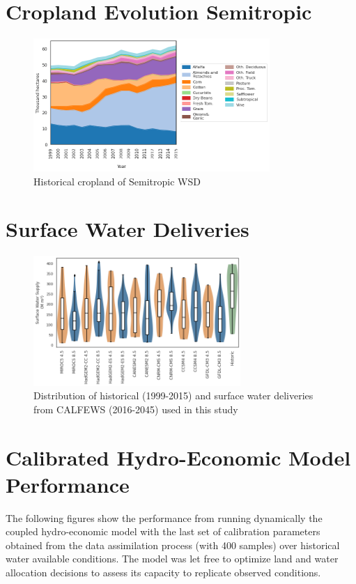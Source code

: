 \documentclass[11pt,a4paper]{article}
\begin{document}
\section{Cropland Evolution Semitropic}

\begin{figure}[H]
    \centering
    \includegraphics[width=0.8\textwidth]{land_hist_semitropic.png}
    \caption{Historical cropland of Semitropic WSD}
    \label{fig:m1esh1}
\end{figure}

\section{Surface Water Deliveries}

\begin{figure}[H]
    \centering
    \includegraphics[width=0.7\textwidth]{gcm_surface_water.png}
    \caption{Distribution of historical (1999-2015) and surface water deliveries from CALFEWS (2016-2045) used in this study} \label{fig:SWSemitropic}
\end{figure}

\section{Calibrated Hydro-Economic Model Performance}

The following figures show the performance from running dynamically the coupled hydro-economic model with the last set of calibration parameters obtained from the data assimilation process (with 400 samples) over historical water available conditions. The model was let free to optimize land and water allocation decisions to assess its capacity to replicate observed conditions. 
\end{document}
